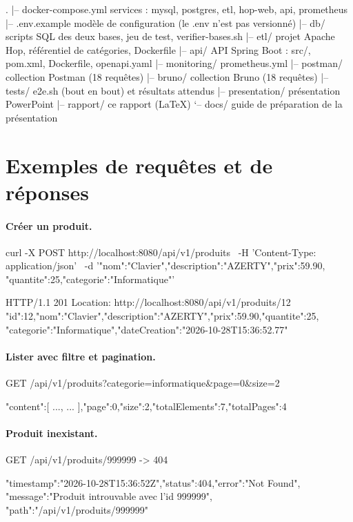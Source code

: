 \documentclass[11pt,a4paper]{article}
\begin{document}
\begin{Code}
.
|-- docker-compose.yml      services : mysql, postgres, etl, hop-web, api, prometheus
|-- .env.example            modèle de configuration (le .env n'est pas versionné)
|-- db/                     scripts SQL des deux bases, jeu de test, verifier-bases.sh
|-- etl/                    projet Apache Hop, référentiel de catégories, Dockerfile
|-- api/                    API Spring Boot : src/, pom.xml, Dockerfile, openapi.yaml
|-- monitoring/             prometheus.yml
|-- postman/                collection Postman (18 requêtes)
|-- bruno/                  collection Bruno (18 requêtes)
|-- tests/                  e2e.sh (bout en bout) et résultats attendus
|-- presentation/          présentation PowerPoint
|-- rapport/                ce rapport (LaTeX)
`-- docs/                   guide de préparation de la présentation
\end{Code}

\section{Exemples de requêtes et de réponses}

\paragraph{Créer un produit.}
\begin{Code}
curl -X POST http://localhost:8080/api/v1/produits \
  -H 'Content-Type: application/json' \
  -d '{"nom":"Clavier","description":"AZERTY","prix":59.90,
       "quantite":25,"categorie":"Informatique"}'

HTTP/1.1 201
Location: http://localhost:8080/api/v1/produits/12
{"id":12,"nom":"Clavier","description":"AZERTY","prix":59.90,"quantite":25,
 "categorie":"Informatique","dateCreation":"2026-10-28T15:36:52.77"}
\end{Code}

\paragraph{Lister avec filtre et pagination.}
\begin{Code}
GET /api/v1/produits?categorie=informatique&page=0&size=2

{"content":[ {...}, {...} ],"page":0,"size":2,"totalElements":7,"totalPages":4}
\end{Code}

\paragraph{Produit inexistant.}
\begin{Code}
GET /api/v1/produits/999999            ->  404

{"timestamp":"2026-10-28T15:36:52Z","status":404,"error":"Not Found",
 "message":"Produit introuvable avec l'id 999999",
 "path":"/api/v1/produits/999999"}
\end{Code}
\end{document}
